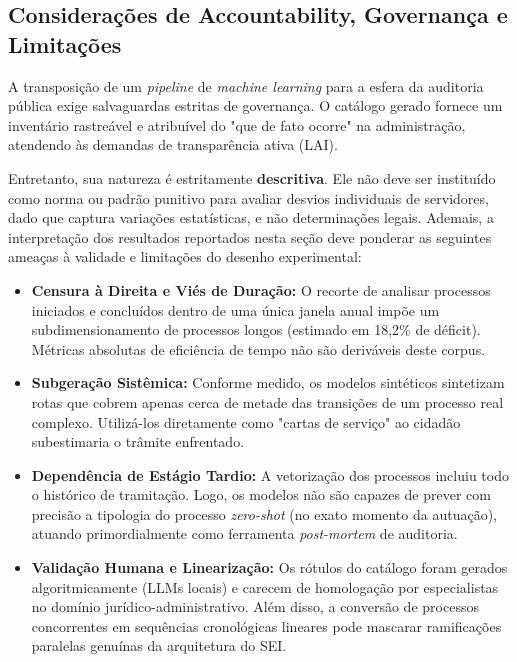 \subsection{Considerações de Accountability, Governança e Limitações}\label{sec:res-accountability}

A transposição de um \emph{pipeline} de \emph{machine learning} para a esfera da auditoria pública exige salvaguardas estritas de governança. O catálogo gerado fornece um inventário rastreável e atribuível do "que de fato ocorre" na administração, atendendo às demandas de transparência ativa (LAI). 

Entretanto, sua natureza é estritamente \textbf{descritiva}. Ele não deve ser instituído como norma ou padrão punitivo para avaliar desvios individuais de servidores, dado que captura variações estatísticas, e não determinações legais. Ademais, a interpretação dos resultados reportados nesta seção deve ponderar as seguintes ameaças à validade e limitações do desenho experimental:

\begin{itemize}
    \item \textbf{Censura à Direita e Viés de Duração:} O recorte de analisar processos iniciados e concluídos dentro de uma única janela anual impõe um subdimensionamento de processos longos (estimado em 18,2\% de déficit). Métricas absolutas de eficiência de tempo não são deriváveis deste corpus.
    \item \textbf{Subgeração Sistêmica:} Conforme medido, os modelos sintéticos sintetizam rotas que cobrem apenas cerca de metade das transições de um processo real complexo. Utilizá-los diretamente como "cartas de serviço" ao cidadão subestimaria o trâmite enfrentado.
    \item \textbf{Dependência de Estágio Tardio:} A vetorização dos processos incluiu todo o histórico de tramitação. Logo, os modelos não são capazes de prever com precisão a tipologia do processo \emph{zero-shot} (no exato momento da autuação), atuando primordialmente como ferramenta \emph{post-mortem} de auditoria.
    \item \textbf{Validação Humana e Linearização:} Os rótulos do catálogo foram gerados algoritmicamente (LLMs locais) e carecem de homologação por especialistas no domínio jurídico-administrativo. Além disso, a conversão de processos concorrentes em sequências cronológicas lineares pode mascarar ramificações paralelas genuínas da arquitetura do SEI.
\end{itemize}